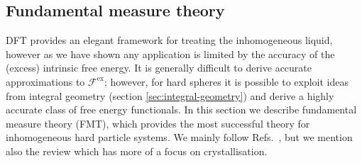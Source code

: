 
\subsection{Fundamental measure theory}
\label{sec:fmt}

DFT provides an elegant framework for treating the inhomogeneous liquid, however as we have shown any application is limited by the accuracy of the (excess) intrinsic free energy.
It is generally difficult to derive accurate approximations to $\mathcal{F}^\mathrm{ex}$; however, for hard spheres%
it is possible to exploit ideas from integral geometry (section \ref{sec:integral-geometry}) and derive a highly accurate class of free energy functionals.
In this section we describe fundamental measure theory (FMT), which provides the most successful theory for inhomogeneous hard particle systems.
We mainly follow Refs.\ \cite{RothJPCM2010,SantosPRE2012}, but we mention also the review \cite{LutskoAiCP2010} which has more of a focus on crystallisation.

